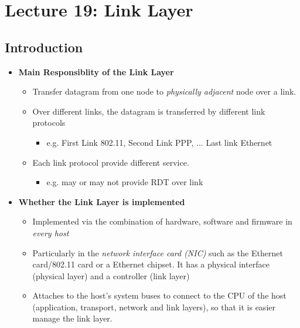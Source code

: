 \documentclass[a4paper]{article}
\begin{document}
\newpage
\section{Lecture 19: Link Layer}
\subsection{Introduction}
\begin{itemize}
    \item \textbf{Main Responsiblity of the Link Layer}
    \begin{itemize}[label=$\circ$]
        \item Transfer datagram from one node to \textit{physically adjacent} node over a link.
        \item Over different links, the datagram is transferred by different link protocols
        \begin{itemize}[label=\tiny$\blacksquare$]
            \item e.g. First Link 802.11, Second Link PPP, ... Last link Ethernet
        \end{itemize}
        \item Each link protocol provide different service.
        \begin{itemize}[label=\tiny$\blacksquare$]
            \item e.g. may or may not provide RDT over link
        \end{itemize}
    \end{itemize}
    \item \textbf{Whether the Link Layer is implemented}
    \begin{itemize}[label=\tiny$\blacksquare$]
        \item Implemented via the combination of hardware, software and firmware in \textit{every host}
        \item Particularly in the \textit{network interface card (NIC)} such as the Ethernet card/802.11 card or a Ethernet chipset. It has a physical interface (physical layer) and a controller (link layer)
        \item Attaches to the host's system buses to connect to the CPU of the host (application, transport, network and link layers), so that it is easier manage the link layer.
    \end{itemize}
\end{itemize}
\end{document}

